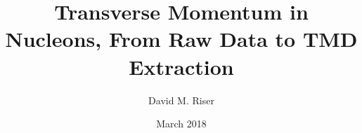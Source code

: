 \title{Transverse Momentum in Nucleons, From Raw Data to TMD Extraction}
\author{David M. Riser}
\date{March 2018}

